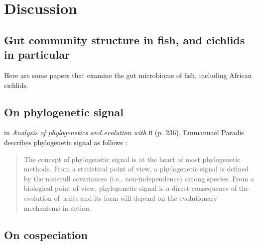 \section{Discussion}

\subsection{Gut community structure in fish, and cichlids in particular}

Here are some papers that examine the gut microbiome of fish, including African cichlids.




\subsection{On phylogenetic signal}

in {\em Analysis of phylogenetics and evolution with {\tt R}} (p. 236), Emmanuael Paradis describes phylogenetic signal as follows :

\begin{quote}
The concept of phylogenetic signal is at the heart of most phylogenetic methods. From a statistical point of view, a phylogenetic signal is defined by the non-null covariances (i.e., non-independence) among species. From a biological point of view, phylogenetic signal is a direct consequence of the evolution of traits and its form will depend on the evolutionary mechanisms in action.
\end{quote}



\subsection{On cospeciation}

